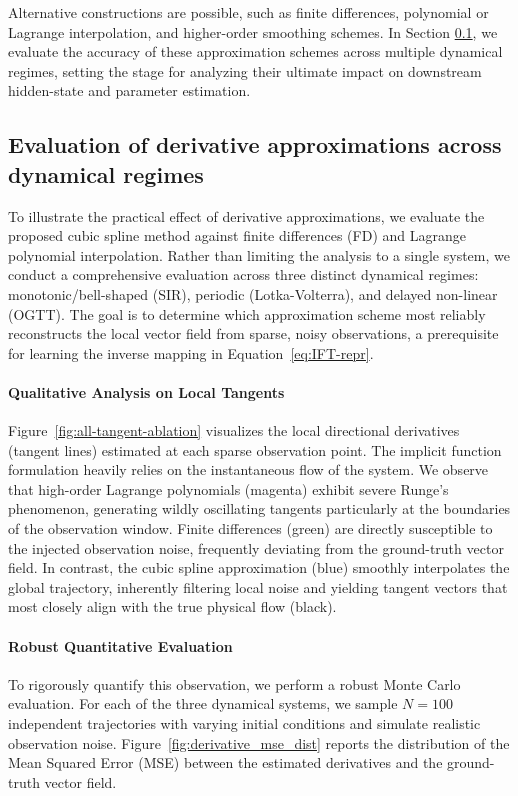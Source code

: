 Alternative constructions are possible, such as finite differences, polynomial or Lagrange interpolation, and higher-order smoothing schemes.
In Section \ref{subsec:derivative-ablation}, we evaluate the accuracy of these approximation schemes across multiple dynamical regimes, setting the stage for analyzing their ultimate impact on downstream hidden-state and parameter estimation.

\subsection{Evaluation of derivative approximations across dynamical regimes}
\label{subsec:derivative-ablation}

To illustrate the practical effect of derivative approximations, we evaluate the proposed cubic spline method against finite differences (FD) and Lagrange polynomial interpolation. Rather than limiting the analysis to a single system, we conduct a comprehensive evaluation across three distinct dynamical regimes: monotonic/bell-shaped (SIR), periodic (Lotka-Volterra), and delayed non-linear (OGTT). The goal is to determine which approximation scheme most reliably reconstructs the local vector field from sparse, noisy observations, a prerequisite for learning the inverse mapping in Equation~\eqref{eq:IFT-repr}.

\paragraph{Qualitative Analysis on Local Tangents} 
Figure~\ref{fig:all-tangent-ablation} visualizes the local directional derivatives (tangent lines) estimated at each sparse observation point. The implicit function formulation heavily relies on the instantaneous flow of the system. We observe that high-order Lagrange polynomials (magenta) exhibit severe Runge's phenomenon, generating wildly oscillating tangents particularly at the boundaries of the observation window. Finite differences (green) are directly susceptible to the injected observation noise, frequently deviating from the ground-truth vector field. In contrast, the cubic spline approximation (blue) smoothly interpolates the global trajectory, inherently filtering local noise and yielding tangent vectors that most closely align with the true physical flow (black).

\paragraph{Robust Quantitative Evaluation}
To rigorously quantify this observation, we perform a robust Monte Carlo evaluation. For each of the three dynamical systems, we sample $N=100$ independent trajectories with varying initial conditions and simulate realistic observation noise. Figure~\ref{fig:derivative_mse_dist} reports the distribution of the Mean Squared Error (MSE) between the estimated derivatives and the ground-truth vector field. 

